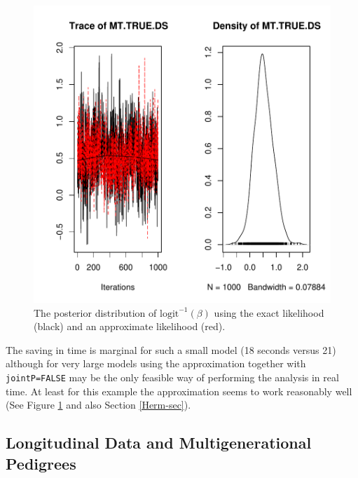\documentclass{article}
\begin{document}
\begin{figure}[!h]
\begin{center}
\includegraphics{Tutorial-092}
\end{center}
\caption{The posterior distribution of $\textrm{logit}^{-1}(\beta)$ using the exact likelihood (black) and an approximate likelihood (red).}
\label{model.ass.mat.approx}
\end{figure}

The saving in time is marginal for such a small model (18 seconds versus 21) although for very large models using the approximation together with \texttt{jointP=FALSE} may be the only feasible way of performing the analysis in real time. At least for this example the approximation seems to work reasonably well (See Figure \ref{model.ass.mat.approx} and also Section \ref{Herm-sec}).\\


\subsection{Longitudinal Data and Multigenerational Pedigrees}
\label{pedigree-sec}
\end{document}
